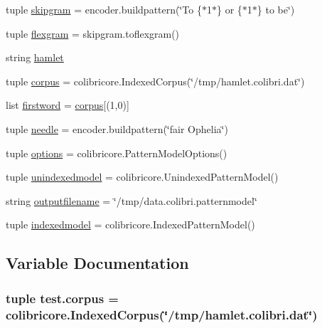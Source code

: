 \begin{DoxyCompactItemize}
\item 
tuple \hyperlink{namespacetest_a4c2fb2fac7937b950be064eae096b564}{skipgram} = encoder.\+buildpattern(\char`\"{}To \{$\ast$1$\ast$\} or \{$\ast$1$\ast$\} to be\char`\"{})
\item 
tuple \hyperlink{namespacetest_a8933a99096108a0d9655a4c91eb38224}{flexgram} = skipgram.\+toflexgram()
\item 
string \hyperlink{namespacetest_aa74f097103f43897cb329756acef4552}{hamlet}
\item 
tuple \hyperlink{namespacetest_aee9d9f416f3ac69649728f0679b460e2}{corpus} = colibricore.\+Indexed\+Corpus(\char`\"{}/tmp/hamlet.\+colibri.\+dat\char`\"{})
\item 
list \hyperlink{namespacetest_a5a126843bd3c37ec8975aee3d83d8728}{firstword} = \hyperlink{namespacetest_aee9d9f416f3ac69649728f0679b460e2}{corpus}\mbox{[}(1,0)\mbox{]}
\item 
tuple \hyperlink{namespacetest_a51ed4c3f6972c49e80c5c430c2d82153}{needle} = encoder.\+buildpattern(\char`\"{}fair Ophelia\char`\"{})
\item 
tuple \hyperlink{namespacetest_a8e4cf0fa4db680c61526b4a824f43d23}{options} = colibricore.\+Pattern\+Model\+Options()
\item 
tuple \hyperlink{namespacetest_aed06428888223bbb3d645936625ebec8}{unindexedmodel} = colibricore.\+Unindexed\+Pattern\+Model()
\item 
string \hyperlink{namespacetest_a11b1ef528efe815402e528cb353937d2}{outputfilename} = \char`\"{}/tmp/data.\+colibri.\+patternmodel\char`\"{}
\item 
tuple \hyperlink{namespacetest_a9d72ba48113d00bd5f59eec20845f71b}{indexedmodel} = colibricore.\+Indexed\+Pattern\+Model()
\end{DoxyCompactItemize}


\subsection{Variable Documentation}
\hypertarget{namespacetest_aee9d9f416f3ac69649728f0679b460e2}{}
\subsubsection[{corpus}]{\setlength{\rightskip}{0pt plus 5cm}tuple test.\+corpus = colibricore.\+Indexed\+Corpus(\char`\"{}/tmp/hamlet.\+colibri.\+dat\char`\"{})}\label{namespacetest_aee9d9f416f3ac69649728f0679b460e2}
\hypertarget{namespacetest_a315e1f1cdf594ddd88b3c64ac5a8d8ea}{}
